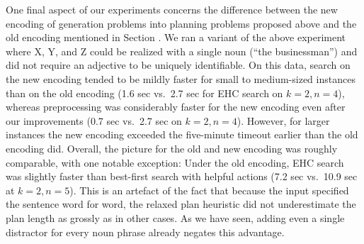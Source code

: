 One final aspect of our experiments concerns the difference between
the new encoding of generation problems into planning problems
proposed above and the old encoding mentioned in Section .
We ran a variant of the above experiment where X, Y, and Z could be
realized with a single noun (``the businessman'') and did not require
an adjective to be uniquely identifiable. On this data, search on the
new encoding tended to be mildly faster for small to medium-sized
instances than on the old encoding (1.6 sec vs.\ 2.7 sec for EHC
search on $k=2,n=4$), whereas preprocessing was considerably faster
for the new encoding even after our improvements (0.7 sec vs.\ 2.7 sec
on $k=2,n=4$).  However, for larger instances the new encoding
exceeded the five-minute timeout earlier than the old encoding did.
Overall, the picture for the old and new encoding was roughly
comparable, with one notable exception: Under the old encoding, EHC
search was slightly faster than best-first search with helpful
actions (7.2 sec vs.\ 10.9 sec at $k=2,n=5$).  This is an artefact of
the fact that because the input specified the sentence word for word,
the relaxed plan heuristic did not underestimate the plan length as
grossly as in other cases.  As we have seen, adding even a single
distractor for every noun phrase already negates this advantage.



